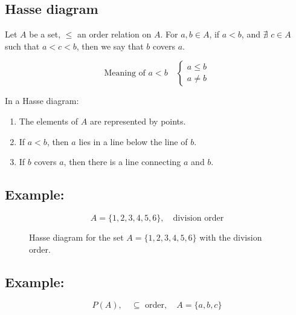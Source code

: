 \documentclass[11pt]{article}
\begin{document}
\subsection{Hasse diagram}
Let $A$ be a set, $\leq$ an order relation on $A$. For $a, b \in A$, if $a < b$, and $\nexists$ $c \in A$ such that $a < c < b$, then we say that $b$ covers $a$.

\[
\text{Meaning of } a < b \quad \begin{cases}
    a \leq b \\
    a \neq b
\end{cases}
\]

In a Hasse diagram: 
\begin{enumerate}
    \item The elements of $A$ are represented by points.
    \item If $a < b$, then $a$ lies in a line below the line of $b$.
    \item If $b$ covers $a$, then there is a line connecting $a$ and $b$.
\end{enumerate}

\subsection*{Example:}
\[
A = \{1,2,3,4,5,6\}, \quad \text{division order}
\]

\begin{figure}[h]
    \centering
    \caption{Hasse diagram for the set $A = \{1,2,3,4,5,6\}$ with the division order.}
    \label{fig:hasse}
\end{figure}

\subsection*{Example:}
\[
P(A), \quad \subseteq \text{ order}, \quad A = \{a,b,c\}
\]
\end{document}
